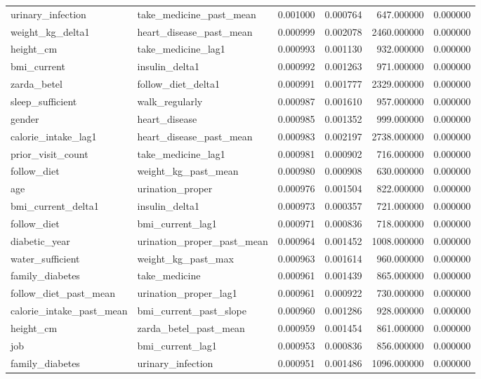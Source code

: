 \begin{longtable}{llrrrr}
urinary\_infection & take\_medicine\_past\_mean & 0.001000 & 0.000764 & 647.000000 & 0.000000 \\
weight\_kg\_delta1 & heart\_disease\_past\_mean & 0.000999 & 0.002078 & 2460.000000 & 0.000000 \\
height\_cm & take\_medicine\_lag1 & 0.000993 & 0.001130 & 932.000000 & 0.000000 \\
bmi\_current & insulin\_delta1 & 0.000992 & 0.001263 & 971.000000 & 0.000000 \\
zarda\_betel & follow\_diet\_delta1 & 0.000991 & 0.001777 & 2329.000000 & 0.000000 \\
sleep\_sufficient & walk\_regularly & 0.000987 & 0.001610 & 957.000000 & 0.000000 \\
gender & heart\_disease & 0.000985 & 0.001352 & 999.000000 & 0.000000 \\
calorie\_intake\_lag1 & heart\_disease\_past\_mean & 0.000983 & 0.002197 & 2738.000000 & 0.000000 \\
prior\_visit\_count & take\_medicine\_lag1 & 0.000981 & 0.000902 & 716.000000 & 0.000000 \\
follow\_diet & weight\_kg\_past\_mean & 0.000980 & 0.000908 & 630.000000 & 0.000000 \\
age & urination\_proper & 0.000976 & 0.001504 & 822.000000 & 0.000000 \\
bmi\_current\_delta1 & insulin\_delta1 & 0.000973 & 0.000357 & 721.000000 & 0.000000 \\
follow\_diet & bmi\_current\_lag1 & 0.000971 & 0.000836 & 718.000000 & 0.000000 \\
diabetic\_year & urination\_proper\_past\_mean & 0.000964 & 0.001452 & 1008.000000 & 0.000000 \\
water\_sufficient & weight\_kg\_past\_max & 0.000963 & 0.001614 & 960.000000 & 0.000000 \\
family\_diabetes & take\_medicine & 0.000961 & 0.001439 & 865.000000 & 0.000000 \\
follow\_diet\_past\_mean & urination\_proper\_lag1 & 0.000961 & 0.000922 & 730.000000 & 0.000000 \\
calorie\_intake\_past\_mean & bmi\_current\_past\_slope & 0.000960 & 0.001286 & 928.000000 & 0.000000 \\
height\_cm & zarda\_betel\_past\_mean & 0.000959 & 0.001454 & 861.000000 & 0.000000 \\
job & bmi\_current\_lag1 & 0.000953 & 0.000836 & 856.000000 & 0.000000 \\
family\_diabetes & urinary\_infection & 0.000951 & 0.001486 & 1096.000000 & 0.000000 \\

\end{longtable}
